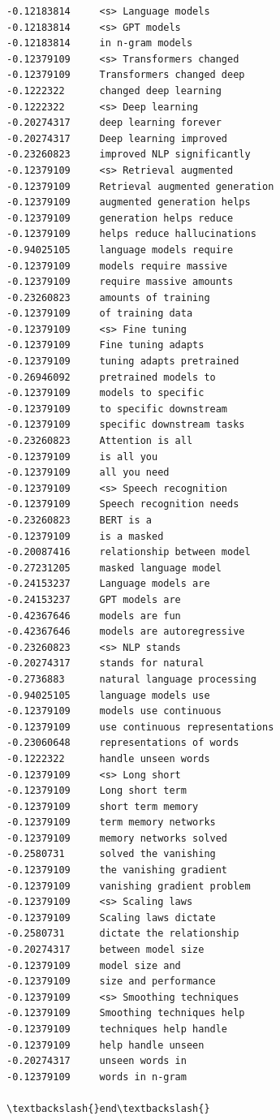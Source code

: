 \documentclass[11pt]{article}
\begin{document}
\begin{Verbatim}[commandchars=\\\{\}]
-0.12183814     <s> Language models
-0.12183814     <s> GPT models
-0.12183814     in n-gram models
-0.12379109     <s> Transformers changed
-0.12379109     Transformers changed deep
-0.1222322      changed deep learning
-0.1222322      <s> Deep learning
-0.20274317     deep learning forever
-0.20274317     Deep learning improved
-0.23260823     improved NLP significantly
-0.12379109     <s> Retrieval augmented
-0.12379109     Retrieval augmented generation
-0.12379109     augmented generation helps
-0.12379109     generation helps reduce
-0.12379109     helps reduce hallucinations
-0.94025105     language models require
-0.12379109     models require massive
-0.12379109     require massive amounts
-0.23260823     amounts of training
-0.12379109     of training data
-0.12379109     <s> Fine tuning
-0.12379109     Fine tuning adapts
-0.12379109     tuning adapts pretrained
-0.26946092     pretrained models to
-0.12379109     models to specific
-0.12379109     to specific downstream
-0.12379109     specific downstream tasks
-0.23260823     Attention is all
-0.12379109     is all you
-0.12379109     all you need
-0.12379109     <s> Speech recognition
-0.12379109     Speech recognition needs
-0.23260823     BERT is a
-0.12379109     is a masked
-0.20087416     relationship between model
-0.27231205     masked language model
-0.24153237     Language models are
-0.24153237     GPT models are
-0.42367646     models are fun
-0.42367646     models are autoregressive
-0.23260823     <s> NLP stands
-0.20274317     stands for natural
-0.2736883      natural language processing
-0.94025105     language models use
-0.12379109     models use continuous
-0.12379109     use continuous representations
-0.23060648     representations of words
-0.1222322      handle unseen words
-0.12379109     <s> Long short
-0.12379109     Long short term
-0.12379109     short term memory
-0.12379109     term memory networks
-0.12379109     memory networks solved
-0.2580731      solved the vanishing
-0.12379109     the vanishing gradient
-0.12379109     vanishing gradient problem
-0.12379109     <s> Scaling laws
-0.12379109     Scaling laws dictate
-0.2580731      dictate the relationship
-0.20274317     between model size
-0.12379109     model size and
-0.12379109     size and performance
-0.12379109     <s> Smoothing techniques
-0.12379109     Smoothing techniques help
-0.12379109     techniques help handle
-0.12379109     help handle unseen
-0.20274317     unseen words in
-0.12379109     words in n-gram

\textbackslash{}end\textbackslash{}
    \end{Verbatim}
\end{document}
